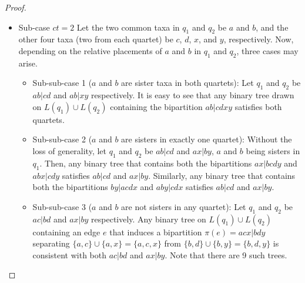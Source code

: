 \documentclass[10pt,a4paper]{article}
\newcommand{\addb}[1]{{\color{red} #1}}
\begin{document}
\begin{appendices}
\begin{proof}
\begin{itemize}
\begin{itemize}
    \item Sub-case $ct = 2$ Let the two common taxa in $q_1$ and $q_2$ be $a$ and $b$, and the other four taxa (two from each quartet) be $c$, $d$, $x$, and $y$, respectively. Now, depending on the relative placements of $a$ and $b$ in $q_1$ and $q_2$, three cases may arise.
\begin{itemize}
    \item Sub-sub-case 1 ($a$ and $b$ are sister taxa in both quartets): Let $q_1$ and $q_2$ be $ab|cd$ and $ab|xy$ respectively. It is easy to see that any binary tree drawn on $L(q_1) \cup L(q_2)$ containing the bipartition $ab|cdxy$ satisfies both quartets.
    \item Sub-sub-case 2 ($a$ and $b$ are sisters in exactly one quartet): Without the loss of generality, let $q_1$ and $q_2$ be $ab|cd$ and $ax|by$, $a$ and $b$ being sisters in $q_1$. Then, any binary tree that contains both the bipartitions $ax|bcdy$ and $abx|cdy$ satisfies $ab|cd$ and $ax|by$. Similarly, any binary tree that contains both the bipartitions $by|acdx$ and $aby|cdx$ satisfies $ab|cd$ and $ax|by$. 
    
    
    \item Sub-sub-case 3 ($a$ and $b$ are not sisters in any quartet): Let $q_1$ and $q_2$ be $ac|bd$ and $ax|by$ respectively. Any binary tree on $L(q_1) \cup L(q_2)$ containing an edge $e$ that induces a bipartition $\pi(e) = acx|bdy$ separating $\{a,c\} \cup \{a,x\} = \{a,c,x\}$ from $\{b,d\} \cup \{b,y\} = \{b,d,y\}$ is consistent with both $ac|bd$ and $ax|by$. Note that there are 9 such trees. 
    

    
    

\end{itemize}
\end{itemize}
\end{itemize}
\end{proof}
\end{appendices}
\end{document}

